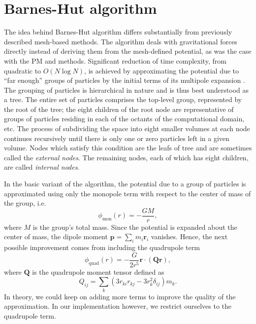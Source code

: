\section{Barnes-Hut algorithm}
The idea behind Barnes-Hut algorithm differs substantially from previously described mesh-based methods.
The algorithm deals with gravitational forces directly instead of deriving them from the mesh-defined potential, as was the case with the PM and \PThreeM{} methods.
Significant reduction of time complexity, from quadratic to $O(N \log N)$, is achieved by approximating the potential due to ``far enough'' groups of particles by the initial terms of its multipole expansion \cite{trenti2008gravitationalnbodysimulations}.
The grouping of particles is hierarchical in nature and is thus best understood as a tree.
The entire set of particles comprises the top-level group, represented by the root of the tree;
the eight children of the root node are representative of groups of particles residing in each of the octants of the computational domain, etc.
The process of subdividing the space into eight smaller volumes at each node continues recursively until there is only one or zero particles left in a given volume.
Nodes which satisfy this condition are the leafs of tree and are sometimes called the \textit{external nodes}.
The remaining nodes, each of which has eight children, are called \textit{internal nodes}.

In the basic variant of the algorithm, the potential due to a group of particles is approximated using only the monopole term with respect to the center of mass of the group, i.e.
\begin{equation*}
    \phi_\text{mon}(r) = -\frac{GM}{r},
\end{equation*}
where $M$ is the group's total mass.
Since the potential is expanded about the center of mass, the dipole moment $\mathbf{p} = \sum_{i} m_i \mathbf{r}_i$ vanishes.
Hence, the next possible improvement comes from including the quadrupole term
\begin{equation*}
    \phi_\text{quad}(r) = -\frac{G}{2r^5} \mathbf{r} \cdot (\mathbf{Q} \mathbf{r}),
\end{equation*}
where $\mathbf{Q}$ is the quadrupole moment tensor defined as
\begin{equation*}
    Q_{ij} = \sum_{k} (3r_{ki}r_{kj} - 3r_k^2\delta_{ij})m_k.
\end{equation*}
In theory, we could keep on adding more terms to improve the quality of the approximation.
In our implementation however, we restrict ourselves to the quadrupole term.

